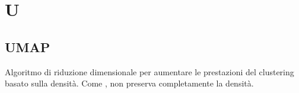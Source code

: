 \section*{U}

\subsection*{UMAP}
Algoritmo di riduzione dimensionale per aumentare le prestazioni del clustering basato sulla densità.
Come , non preserva completamente la densità.
